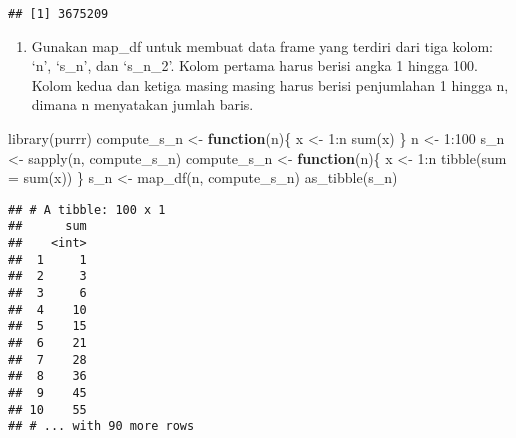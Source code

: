 \documentclass[
]{article}
\newenvironment{Shaded}{\begin{snugshade}}{\end{snugshade}}
\newcommand{\AttributeTok}[1]{\textcolor[rgb]{0.77,0.63,0.00}{#1}}
\newcommand{\ControlFlowTok}[1]{\textcolor[rgb]{0.13,0.29,0.53}{\textbf{#1}}}
\newcommand{\DecValTok}[1]{\textcolor[rgb]{0.00,0.00,0.81}{#1}}
\newcommand{\FunctionTok}[1]{\textcolor[rgb]{0.00,0.00,0.00}{#1}}
\newcommand{\NormalTok}[1]{#1}
\newcommand{\OtherTok}[1]{\textcolor[rgb]{0.56,0.35,0.01}{#1}}
\newcommand{\SpecialCharTok}[1]{\textcolor[rgb]{0.00,0.00,0.00}{#1}}
\providecommand{\tightlist}{%
  \setlength{\itemsep}{0pt}\setlength{\parskip}{0pt}}
\begin{document}
\begin{Shaded}
\end{Shaded}

\begin{verbatim}
## [1] 3675209
\end{verbatim}

\begin{enumerate}
\def\labelenumi{\arabic{enumi}.}
\setcounter{enumi}{3}
\tightlist
\item
  Gunakan map\_df untuk membuat data frame yang terdiri dari tiga kolom:
  `n', `s\_n', dan `s\_n\_2'. Kolom pertama harus berisi angka 1 hingga
  100. Kolom kedua dan ketiga masingmasing harus berisi penjumlahan 1
  hingga n, dimana n menyatakan jumlah baris.
\end{enumerate}

\begin{Shaded}
\begin{Highlighting}[]
\FunctionTok{library}\NormalTok{(purrr)}
\NormalTok{compute\_s\_n }\OtherTok{\textless{}{-}} \ControlFlowTok{function}\NormalTok{(n)\{ }
\NormalTok{ x }\OtherTok{\textless{}{-}} \DecValTok{1}\SpecialCharTok{:}\NormalTok{n }
 \FunctionTok{sum}\NormalTok{(x) }
\NormalTok{\} }
\NormalTok{n }\OtherTok{\textless{}{-}} \DecValTok{1}\SpecialCharTok{:}\DecValTok{100} 
\NormalTok{s\_n }\OtherTok{\textless{}{-}} \FunctionTok{sapply}\NormalTok{(n, compute\_s\_n)}
\NormalTok{compute\_s\_n }\OtherTok{\textless{}{-}} \ControlFlowTok{function}\NormalTok{(n)\{ }
\NormalTok{ x }\OtherTok{\textless{}{-}} \DecValTok{1}\SpecialCharTok{:}\NormalTok{n }
 \FunctionTok{tibble}\NormalTok{(}\AttributeTok{sum =} \FunctionTok{sum}\NormalTok{(x)) }
\NormalTok{\} }
\NormalTok{s\_n }\OtherTok{\textless{}{-}} \FunctionTok{map\_df}\NormalTok{(n, compute\_s\_n)}
\FunctionTok{as\_tibble}\NormalTok{(s\_n)}
\end{Highlighting}
\end{Shaded}

\begin{verbatim}
## # A tibble: 100 x 1
##      sum
##    <int>
##  1     1
##  2     3
##  3     6
##  4    10
##  5    15
##  6    21
##  7    28
##  8    36
##  9    45
## 10    55
## # ... with 90 more rows
\end{verbatim}
\end{document}
